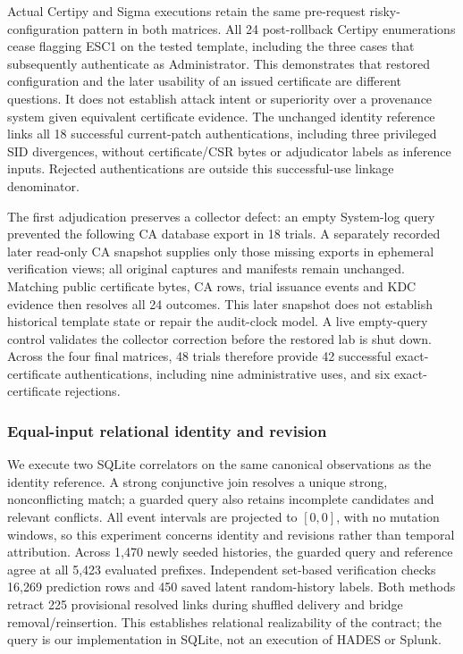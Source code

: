 Actual Certipy and Sigma executions retain the same pre-request risky-configuration pattern in both matrices. All 24 post-rollback Certipy enumerations cease flagging ESC1 on the tested template, including the three cases that subsequently authenticate as Administrator. This demonstrates that restored configuration and the later usability of an issued certificate are different questions. It does not establish attack intent or superiority over a provenance system given equivalent certificate evidence. The unchanged identity reference links all 18 successful current-patch authentications, including three privileged SID divergences, without certificate/CSR bytes or adjudicator labels as inference inputs. Rejected authentications are outside this successful-use linkage denominator.

The first adjudication preserves a collector defect: an empty System-log query prevented the following CA database export in 18 trials. A separately recorded later read-only CA snapshot supplies only those missing exports in ephemeral verification views; all original captures and manifests remain unchanged. Matching public certificate bytes, CA rows, trial issuance events and KDC evidence then resolves all 24 outcomes. This later snapshot does not establish historical template state or repair the audit-clock model. A live empty-query control validates the collector correction before the restored lab is shut down. Across the four final matrices, 48 trials therefore provide 42 successful exact-certificate authentications, including nine administrative uses, and six exact-certificate rejections.

\subsubsection{Equal-input relational identity and revision}
We execute two SQLite correlators on the same canonical observations as the identity reference. A strong conjunctive join resolves a unique strong, nonconflicting match; a guarded query also retains incomplete candidates and relevant conflicts. All event intervals are projected to $[0,0]$, with no mutation windows, so this experiment concerns identity and revisions rather than temporal attribution. Across 1,470 newly seeded histories, the guarded query and reference agree at all 5,423 evaluated prefixes. Independent set-based verification checks 16,269 prediction rows and 450 saved latent random-history labels. Both methods retract 225 provisional resolved links during shuffled delivery and bridge removal/reinsertion. This establishes relational realizability of the contract; the query is our implementation in SQLite, not an execution of HADES or Splunk.

